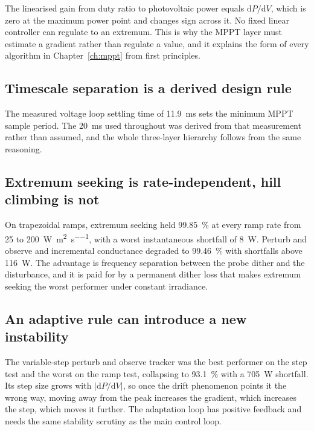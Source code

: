 The linearised gain from duty ratio to photovoltaic power equals
$\mathrm{d}P/\mathrm{d}V$, which is zero at the maximum power point and changes
sign across it. No fixed linear controller can regulate to an extremum. This is
why the MPPT layer must estimate a gradient rather than regulate a value, and it
explains the form of every algorithm in Chapter~\ref{ch:mppt} from first
principles.

\subsection{Timescale separation is a derived design rule}

The measured voltage loop settling time of \SI{11.9}{\milli\second} sets the
minimum MPPT sample period. The \SI{20}{\milli\second} used throughout was
derived from that measurement rather than assumed, and the whole three-layer
hierarchy follows from the same reasoning.

\subsection{Extremum seeking is rate-independent, hill climbing is not}

On trapezoidal ramps, extremum seeking held \SI{99.85}{\percent} at every ramp
rate from \SI{25}{} to \SI{200}{\watt\per\square\metre\per\second}, with a worst
instantaneous shortfall of \SI{8}{\watt}. Perturb and observe and incremental
conductance degraded to \SI{99.46}{\percent} with shortfalls above
\SI{116}{\watt}. The advantage is frequency separation between the probe dither
and the disturbance, and it is paid for by a permanent dither loss that makes
extremum seeking the worst performer under constant irradiance.

\subsection{An adaptive rule can introduce a new instability}

The variable-step perturb and observe tracker was the best performer on the step
test and the worst on the ramp test, collapsing to \SI{93.1}{\percent} with a
\SI{705}{\watt} shortfall. Its step size grows with $|\mathrm{d}P/\mathrm{d}V|$,
so once the drift phenomenon points it the wrong way, moving away from the peak
increases the gradient, which increases the step, which moves it further. The
adaptation loop has positive feedback and needs the same stability scrutiny as
the main control loop.

